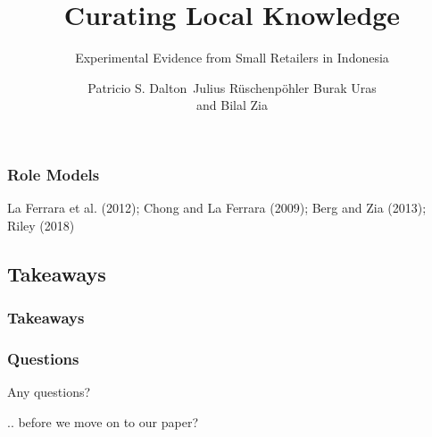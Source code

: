 \documentclass[hideothersubsections, usenames,dvipsnames,11pt]{beamer}
\newenvironment{itemize_2pt}{\itemize\addtolength{\itemsep}{2pt}}{\enditemize}
\begin{document}
\begin{frame}
\frametitle{Role Models}
	\begin{itemize_2pt}
	\item  La Ferrara et al. (2012); Chong and La Ferrara (2009); Berg and Zia (2013); Riley (2018)
	\vspace{0.1in}
	\end{itemize_2pt}
\end{frame}



\subsection{Takeaways}

\begin{frame}
\frametitle{Takeaways}
	\begin{itemize_2pt}
    \item
   	\vspace{0.10in}
\end{itemize_2pt}
\end{frame}

\begin{frame}
\frametitle{Questions}
	\textcolor{bdf}{Any questions?}
	\begin{itemize_2pt}
	\item[] .. before we move on to our paper?
	\end{itemize_2pt}
\end{frame}




\title[]{Curating Local Knowledge}
\subtitle{Experimental Evidence from Small Retailers in Indonesia}

\author[]
{Patricio S. Dalton\
Julius R{\"u}schenp{\"o}hler
Burak Uras\inst{1}\\and
Bilal Zia}

\end{document}
